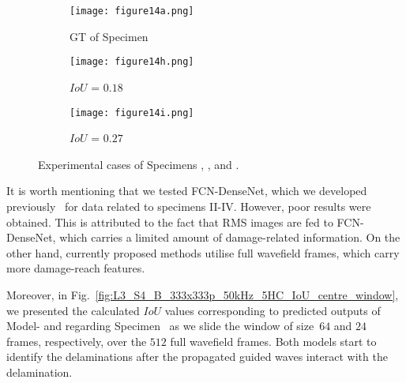 \begin{figure} [!h]
	\par\medskip
	\begin{subfigure}[b]{0.32\textwidth}
		\centering
		\texttt{[image: figure14a.png]}
		\caption{GT of Specimen~}
		\label{fig:gt_specimen_4}
	\end{subfigure}
	\hfill
	\begin{subfigure}[b]{0.32\textwidth}
		\centering
		\texttt{[image: figure14h.png]}
		\caption{\(IoU\) = \(0.18\)}  
		\label{fig:L3_S4_B_saeed}
	\end{subfigure}
	\hfill
	\begin{subfigure}[b]{0.32\textwidth}
		\centering
		\texttt{[image: figure14i.png]}
		\caption{\(IoU\) = \(0.27\)} 
		\label{fig:L3_S4_B_ijjeh}
	\end{subfigure}
	\caption{Experimental cases of Specimens , , and .}
	\label{fig:exp_case}
\end{figure} 

It is worth mentioning that we tested FCN-DenseNet, which we developed previously~\cite{Ijjeh2021} for data related to specimens II-IV. 
However, poor results were obtained. 
This is attributed to the fact that RMS images are fed to FCN-DenseNet, which carries a limited amount of damage-related information. 
On the other hand, currently proposed methods utilise full wavefield frames, which carry more damage-reach features. 

Moreover, in Fig.~\ref{fig:L3_S4_B_333x333p_50kHz_5HC_IoU_centre_window}, we presented the calculated \(IoU\) values corresponding to predicted outputs of Model- and  regarding Specimen~ as we slide the window of size~\(64\) and \(24\) frames, respectively, over the \(512\) full wavefield frames.
Both models start to identify the delaminations after the propagated guided waves interact with the delamination.

